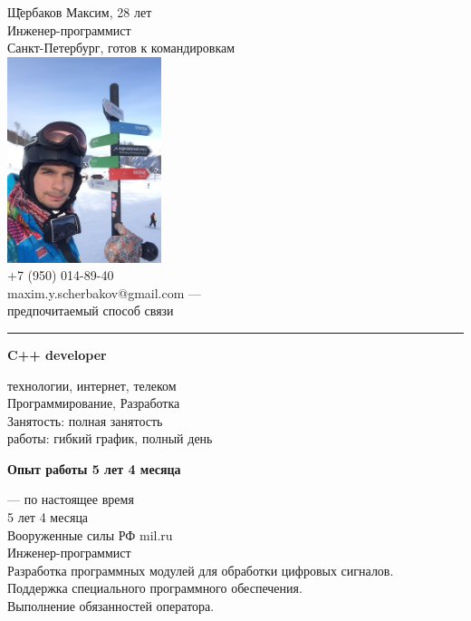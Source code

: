 \documentclass[9pt,fleqn,a4paper]{article}
\begin{document}
	\begin{tabbing}
	\hspace{11cm} \= \= Щербаков Максим, 28 лет \\
	 \> Инженер-программист \\
	\> Санкт-Петербург, готов к командировкам \\
	\>  \includegraphics[width=4.5cm]{foto} \\
	\> +7 (950) 014-89-40  \\
	\> maxim.y.scherbakov@gmail.com — \\
	\> предпочитаемый способ связи

  	\end{tabbing}
	\hrule
	\vspace{1cm}




	\begin{center}
		{\large\bf C++ developer}
	\end{center}	
	
	 технологии, интернет, телеком \\
	Программирование, Разработка \\
	Занятость: полная занятость \\

	 работы: гибкий график, полный день \\

	\begin{center}
		{\large\bf Опыт работы 5 лет 4 месяца}
	\end{center}	
	
	 — по настоящее время\\
5 лет 4 месяца \\
	Вооруженные силы РФ mil.ru \\
	Инженер-программист \\
Разработка программных модулей для обработки цифровых сигналов. \\
Поддержка специального программного обеспечения.  \\
Выполнение обязанностей оператора. \\
\end{document}
